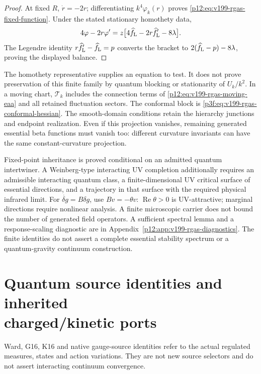 \documentclass[12pt,a4paper]{article}
\begin{document}
\begin{proof}
At fixed \(R\), \(\dot r=-2r\); differentiating
\(k^4\varphi_k(r)\) proves
\eqref{p12:eq:v199-rgas-fixed-function}.  Under the stated stationary
homothety data,
\[
4\varphi-2r\varphi'
=z\bigl[4\widehat f_{\rm L}-2r\widehat f_{\rm L}'-8\lambda\bigr].
\]
The Legendre identity
\(r\widehat f_{\rm L}'-\widehat f_{\rm L}=p\) converts the bracket to
\(2(\widehat f_{\rm L}-p)-8\lambda\), proving the displayed balance.
\end{proof}
The homothety representative supplies an equation to test.  It does not
prove preservation of this finite family by quantum blocking or
stationarity of \(U_k/k^2\).  In a moving chart,
\(\mathcal T_k\) includes the connection terms of
\eqref{p12:eq:v199-rgas-moving-eaa} and all retained fluctuation sectors.
The conformal block is \eqref{p3f:eq:v199-rgas-conformal-hessian}.
The smooth-domain conditions retain the hierarchy junctions and endpoint
realization.  Even if this projection vanishes, remaining generated
essential beta functions must vanish too: different curvature invariants
can have the same constant-curvature projection.

\begin{remark}
\label{p12:rem:v199-rgas-as-scope}
Fixed-point inheritance is proved conditional on an admitted quantum
intertwiner.  A Weinberg-type interacting UV completion additionally
requires an admissible interacting quantum class, a finite-dimensional
UV critical surface of essential directions, and a trajectory in that
surface with the required physical infrared limit.
For \(\dot{\delta g}=B\delta g\), use \(Bv=-\theta v\):
\(\operatorname{Re}\theta>0\) is UV-attractive; marginal directions
require nonlinear analysis.  A finite microscopic carrier does not bound
the number of generated field operators.  A sufficient spectral lemma
and a response-scaling diagnostic are in
Appendix~\ref{p12:app:v199-rgas-diagnostics}.
The finite identities do not assert a complete essential stability
spectrum or a quantum-gravity continuum construction.
\end{remark}




\section[Quantum source identities and inherited charged/kinetic ports]{Quantum source identities and inherited\\charged/kinetic ports}
\label{p12:sec:v237-c6}
Ward, G16, K16 and native gauge-source identities refer to the actual regulated measures, states and action variations. They are not new source selectors and do not assert interacting continuum convergence.
\end{document}
